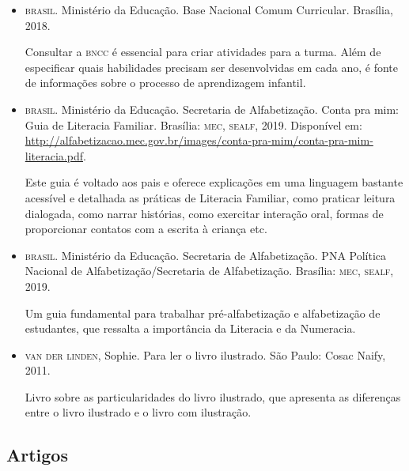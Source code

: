 \documentclass[11pt]{extarticle}
\begin{document}
\begin{itemize}
\item \textsc{brasil}. Ministério da Educação. Base Nacional Comum Curricular. Brasília, 2018.

Consultar a \textsc{bncc} é essencial para criar atividades para a turma. Além de especificar 
quais habilidades precisam ser desenvolvidas em cada ano, é fonte de informações sobre 
o processo de aprendizagem infantil. 

\item \textsc{brasil}. Ministério da Educação. Secretaria de Alfabetização. Conta pra mim: Guia de Literacia Familiar. 
Brasília: \textsc{mec, sealf}, 2019. Disponível em: \url{http://alfabetizacao.mec.gov.br/images/conta-pra-mim/conta-pra-mim-literacia.pdf}.

Este guia é voltado aos pais e oferece explicações em uma linguagem bastante acessível e detalhada as práticas de Literacia Familiar, 
como praticar leitura dialogada, como narrar histórias, como exercitar interação oral, formas de proporcionar contatos com a escrita à criança etc. 
 
\item \textsc{brasil}. Ministério da Educação. Secretaria de Alfabetização. PNA Política Nacional de Alfabetização/Secretaria 
de Alfabetização. Brasília: \textsc{mec, sealf}, 2019.

Um guia fundamental para trabalhar pré-alfabetização e alfabetização de estudantes, que ressalta a importância da Literacia e da Numeracia. 

\item \textsc{van der linden}, Sophie. Para ler o livro ilustrado. São Paulo: Cosac Naify, 2011.

Livro sobre as particularidades do livro ilustrado, que apresenta as diferenças entre o livro ilustrado e o livro com ilustração. 
\end{itemize}

\subsection{Artigos}
\end{document}
